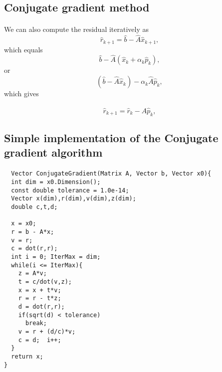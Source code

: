 \documentclass[%
oneside,                 %
final,                   %
10pt]{article}
\begin{document}
\subsection*{Conjugate gradient method}

\paragraph{}
We can also  compute the residual iteratively as
\begin{equation*}
\hat{r}_{k+1}=\hat{b}-\hat{A}\hat{x}_{k+1},
 \end{equation*}
which equals
\begin{equation*}
\hat{b}-\hat{A}(\hat{x}_k+\alpha_k\hat{p}_k),
 \end{equation*}
or
\begin{equation*}
(\hat{b}-\hat{A}\hat{x}_k)-\alpha_k\hat{A}\hat{p}_k,
 \end{equation*}
which gives

\begin{equation*}
\hat{r}_{k+1}=\hat{r}_k-\hat{A}\hat{p}_{k},
 \end{equation*}





\subsection*{Simple implementation of the Conjugate gradient algorithm}

\paragraph{}
\begin{verbatim}
  Vector ConjugateGradient(Matrix A, Vector b, Vector x0){
  int dim = x0.Dimension();
  const double tolerance = 1.0e-14;
  Vector x(dim),r(dim),v(dim),z(dim);
  double c,t,d;

  x = x0;
  r = b - A*x;
  v = r;
  c = dot(r,r);
  int i = 0; IterMax = dim;
  while(i <= IterMax){
    z = A*v;
    t = c/dot(v,z);
    x = x + t*v;
    r = r - t*z;
    d = dot(r,r);
    if(sqrt(d) < tolerance)
      break;
    v = r + (d/c)*v;
    c = d;  i++;
  }
  return x;
} 
\end{verbatim}
\end{document}
